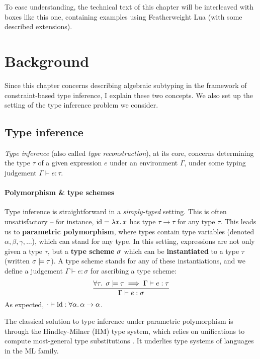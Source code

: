 \begin{example}
    To ease understanding, the technical text of this chapter will be interleaved with boxes like this one, containing examples using Featherweight Lua (with some described extensions).
\end{example}

\section{Background}
\label{sec:ch3background}

Since this chapter concerns describing algebraic subtyping in the framework of constraint-based type inference, I explain these two concepts. We also set up the setting of the type inference problem we consider. 

\subsection{Type inference}
\emph{Type inference} (also called \emph{type reconstruction}), at its core, concerns determining the type $\tau$ of a given expression $e$ under an environment $\Gamma$, under some typing judgement $\Gamma \vdash e : \tau$.

\paragraph{Polymorphism \& type schemes} Type inference is straightforward in a \emph{simply-typed} setting. This is often unsatisfactory -- for instance, $\mathrm{id} =  \lambda x \ldotp x$ has type $\tau \to \tau$ for any type $\tau$.
This leads us to \textbf{parametric polymorphism}, where types contain type variables (denoted $\alpha, \beta, \gamma, \dots$), which can stand for any type. 
In this setting, expressions are not only given a type $\tau$, but a \textbf{type scheme} $\sigma$ which can be \textbf{instantiated} to a type $\tau$ (written $\sigma \models \tau$). A type scheme stands for any of these instantiations, and we define a judgement $\Gamma \vdash e : \sigma$ for ascribing a type scheme:
$$ \dfrac{\forall \tau \ldotp\; \sigma \models \tau \implies \Gamma \vdash e : \tau}{\Gamma \vdash e : \sigma} $$
As expected, $\cdot \vdash \mathrm{id} : \forall \alpha \ldotp \alpha \to \alpha$.

The classical solution to type inference under parametric polymorphism is through the Hindley-Milner (HM) type system, which relies on unifications to compute most-general type substitutions \cite{essence-of-ml-type-inference, tapl}. It underlies type systems of languages in the ML family.


